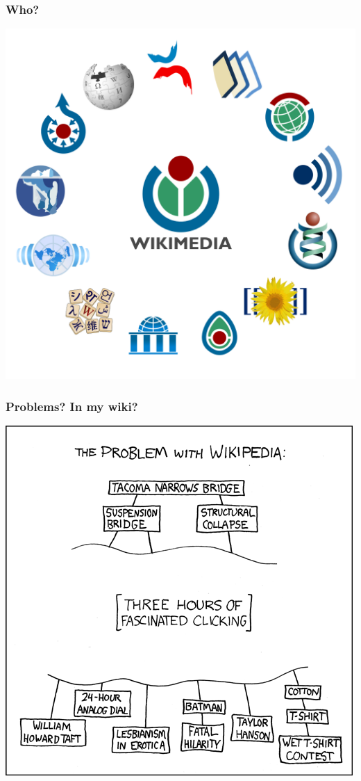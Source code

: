 \documentclass{beamer}
\begin{document}
\begin{frame}
  \frametitle{Who?}
  \begin{center}
    \includegraphics[height = 0.8\textheight, keepaspectratio = true]{figure/wiki_family}
  \end{center}
\end{frame}

\begin{frame}
  \frametitle{Problems? In my wiki?}
  \begin{center}
    \includegraphics[height = 0.8\textheight, keepaspectratio = true]{figure/the_problem_with_wikipedia}
  \end{center}
\end{frame}
\end{document}
